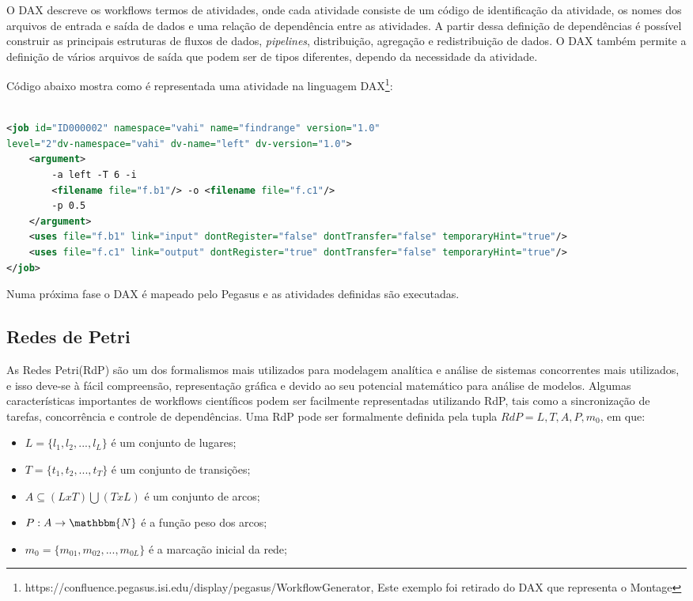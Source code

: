 		O DAX descreve os workflows termos de atividades, onde cada atividade consiste de um código de identificação da atividade, os nomes dos arquivos de entrada e saída de dados e uma relação de dependência entre as atividades. A partir dessa definição de dependências é possível construir as principais estruturas de fluxos de dados, \textit{pipelines}, distribuição, agregação e redistribuição de dados. O DAX também permite a definição de vários arquivos de saída que podem ser de tipos diferentes, dependo da necessidade da atividade\cite{Teixeira2013}. 
		
		 Código abaixo mostra como é representada uma atividade na linguagem DAX\footnote{https://confluence.pegasus.isi.edu/display/pegasus/WorkflowGenerator, Este exemplo foi retirado do DAX que representa o Montage}:
		

\begin{lstlisting}[language=XML, caption=Exemplo de uma atividade DAX]

<job id="ID000002" namespace="vahi" name="findrange" version="1.0" 
level="2"dv-namespace="vahi" dv-name="left"	dv-version="1.0">
	<argument>
		-a left -T 6 -i 
		<filename file="f.b1"/> -o <filename file="f.c1"/>
		-p 0.5
	</argument>
	<uses file="f.b1" link="input" dontRegister="false" dontTransfer="false" temporaryHint="true"/>
	<uses file="f.c1" link="output" dontRegister="true" dontTransfer="false" temporaryHint="true"/>
</job>

\end{lstlisting}

	Numa próxima fase o DAX é mapeado pelo Pegasus e as atividades definidas são executadas.
	
	\subsection{Redes de Petri}
		As Redes Petri(RdP) são um dos formalismos mais utilizados para modelagem analítica e análise de sistemas concorrentes mais utilizados, e isso deve-se à fácil compreensão, representação gráfica e devido ao seu potencial matemático para análise de modelos. Algumas características importantes de workflows científicos podem ser facilmente representadas utilizando RdP, tais como a sincronização de tarefas, concorrência e controle de dependências\cite{Braghetto2011}.
		Uma RdP pode ser formalmente definida pela tupla $RdP={L,T,A,P,m_{0}}$, em que:
		\begin{itemize}
		\item $L=\{l_{1},l_{2},...,l_{L}\}$ é um conjunto de lugares;
		\item $T=\{t_{1},t_{2},...,t_{T}\}$ é um conjunto de transições;
		\item $A\subseteq(L x T)\bigcup (TxL)$ é um conjunto de arcos;
		\item $P: A \rightarrow \mathbbm{N}$ é a função peso dos arcos;
		\item $m_{0}=\{m_{01},m_{02},...,m_{0L}\}$ é a marcação inicial da rede;
		\end{itemize}

